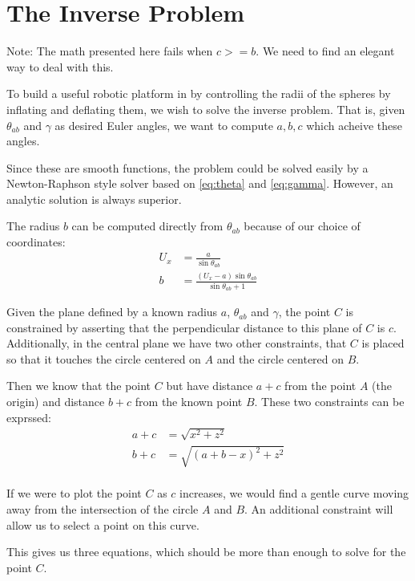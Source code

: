 \documentclass{article}
\begin{document}
\section{The Inverse Problem}

Note: The math presented here fails when $c >= b$. We need
to find an elegant way to deal with this.

To build a useful robotic platform in by controlling the radii of the
spheres by inflating and deflating them, we wish to solve the inverse
problem. That is, given $\theta_{ab}$ and $\gamma$ as desired Euler
angles, we want to compute $a,b,c$ which acheive these angles.

Since these are smooth functions, the problem could be solved
easily by a Newton-Raphson style solver based on \ref{eq:theta} and \ref{eq:gamma}. However, an analytic solution is always superior.




The radius $b$ can be computed directly from $\theta_{ab}$
because of our choice of coordinates:
\begin{align}
  U_x &= \frac{a}{\sin{\theta_{ab}}} \\
  b &= \frac{(U_x - a)\sin{\theta_{ab}}}{\sin{\theta_{ab}}+1}
\end{align}

\newcommand{\abs}[1]{ \left\lvert#1\right\rvert}

Given the plane defined by a known radius $a$, $\theta_{ab}$ and $\gamma$, the point $C$ is constrained by asserting that the perpendicular
distance to this plane of $C$ is $c$.
Additionally, in the central plane we have two other constraints,
that $C$ is placed so that it touches the circle centered on $A$ and
the circle centered on $B$.

Then we know that the point $C$ but have distance $a+c$ from
the point $A$ (the origin) and distance $b+c$ from the known
point $B$. These two constraints can be exprssed:
\begin{align}
a + c &= \sqrt{x^2 + z ^2} \label{eq:a_constraint}\\
b + c &= \sqrt{(a+b-x)^2 + z^2} \label{eq:b_constraint} \\
\end{align}

If we were to plot the point $C$ as $c$ increases, we
would find a gentle curve moving away from the intersection
of the circle $A$ and $B$. An additional constraint will
allow us to select a point on this curve.

This gives us three equations, which
should be more than enough to solve for the point $C$.
\end{document}
